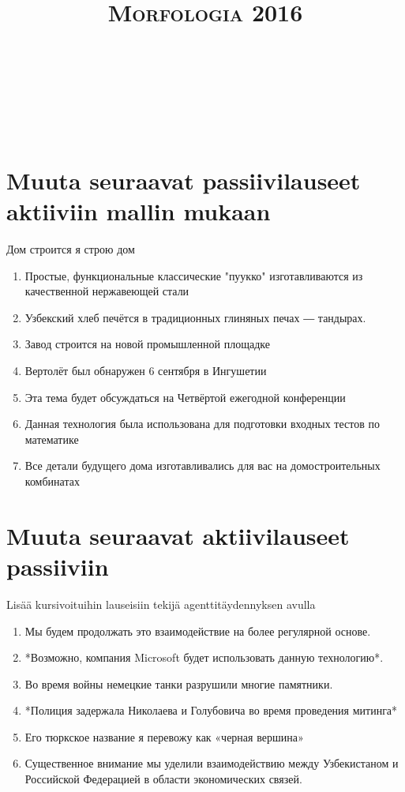 \documentclass[paper=a4, fontsize=11pt]{scrartcl}
\title{	
\normalfont \normalsize 
\textsc{Morfologia 2016} \\ [25pt] 
\horrule{0.5pt} \\[0.4cm] 
\huge  \\ 
\horrule{2pt} \\[0.5cm] 
}
\date{}
\begin{document}
\onehalfspacing

\section{Muuta seuraavat passiivilauseet aktiiviin mallin mukaan}

Дом строится \rightarrow я строю дом

\begin{enumerate}
    \item Простые, функциональные классические "пуукко" изготавливаются из качественной нержавеющей стали
    \item Узбекский хлеб печётся в традиционных глиняных печах ― тандырах.
    \item Завод строится на новой промышленной площадке
    \item Вертолёт был обнаружен 6 сентября в Ингушетии
    \item Эта тема будет обсуждаться на Четвёртой ежегодной конференции
    \item Данная технология была использована для подготовки входных тестов по математике
    \item Все детали будущего дома изготавливались для вас на домостроительных комбинатах
\end{enumerate}

\section{Muuta seuraavat aktiivilauseet passiiviin}

Lisää kursivoituihin lauseisiin tekijä agenttitäydennyksen avulla

\begin{enumerate}
    \item Мы будем продолжать это взаимодействие на более регулярной основе.
    \item *Возможно, компания Microsoft будет использовать данную технологию*.
    \item Во время войны немецкие танки разрушили многие памятники.
    \item *Полиция задержала Николаева и Голубовича во время проведения митинга*
    \item Его тюркское название я перевожу как «черная вершина»
    \item  Существенное внимание мы уделили взаимодействию между Узбекистаном и Российской Федерацией в области экономических связей.
\end{enumerate}
\end{document}
